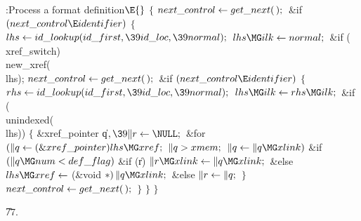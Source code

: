 \Y\B\4:Process a format definition\X${}\E{}$\6
${}\{{}$\1\6
${}\\{next\_control}\leftarrow\\{get\_next}(\,);{}$\6
\&{if} ${}(\\{next\_control}\E\\{identifier}){}$\5
${}\{{}$\1\6
${}\\{lhs}\K\\{id\_lookup}(\\{id\_first},\39\\{id\_loc},\39\\{normal});{}$\6
${}\\{lhs}\MG\\{ilk}\K\\{normal};{}$\6
\&{if} (\\{xref\_switch})\1\5
\\{new\_xref}(\\{lhs});\2\6
${}\\{next\_control}\leftarrow\\{get\_next}(\,);{}$\6
\&{if} ${}(\\{next\_control}\E\\{identifier}){}$\5
${}\{{}$\1\6
${}\\{rhs}\K\\{id\_lookup}(\\{id\_first},\39\\{id\_loc},\39\\{normal});{}$\6
${}\\{lhs}\MG\\{ilk}\K\\{rhs}\MG\\{ilk};{}$\6
\&{if} (\\{unindexed}(\\{lhs}))\5
${}\{{}$\1\6
\&{xref\_pointer} \|q${},\39\|r\K\NULL;{}$\7
\&{for} ${}(\|q\K(\&{xref\_pointer})\,\\{lhs}\MG\\{xref};{}$ ${}\|q>%
\\{xmem};{}$ ${}\|q\K\|q\MG\\{xlink}){}$\1\6
\&{if} ${}(\|q\MG\\{num}<\\{def\_flag}){}$\1\6
\&{if} (\|r)\1\5
${}\|r\MG\\{xlink}\K\|q\MG\\{xlink};{}$\2\6
\&{else}\1\5
${}\\{lhs}\MG\\{xref}\K{}$(\&{void} ${}{*})\,\|q\MG\\{xlink};{}$\2\2\6
\&{else}\1\5
${}\|r\leftarrow\|q;{}$\2\2\6
\4${}\}{}$\2\6
${}\\{next\_control}\leftarrow\\{get\_next}(\,);{}$\6
\4${}\}{}$\2\6
\4${}\}{}$\2\6
\4${}\}{}$\2\par
\U77.\fi

